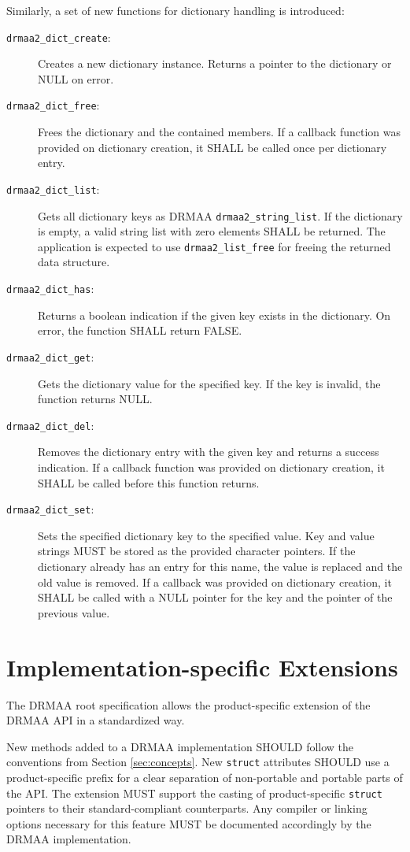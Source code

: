 \documentclass{article}
\newcommand{\h}[1]{\texttt{#1}}
\begin{document}
Similarly, a set of new functions for dictionary handling is introduced:

\begin{description}
\item[\h{drmaa2\_dict\_create}:] Creates a new dictionary instance. Returns a pointer to the dictionary or NULL on error.
\item[\h{drmaa2\_dict\_free}:] Frees the dictionary and the contained members. If a callback function was provided on dictionary creation, it SHALL be called once per dictionary entry.
\item[\h{drmaa2\_dict\_list}:] Gets all dictionary keys as DRMAA \h{drmaa2\_string\_list}. If the dictionary is empty, a valid string list with zero elements SHALL be returned. The application is expected to use \h{drmaa2\_list\_free} for freeing the returned data structure.  
\item[\h{drmaa2\_dict\_has}:] Returns a boolean indication if the given key exists in the dictionary. On error, the function SHALL return FALSE. 
\item[\h{drmaa2\_dict\_get}:] Gets the dictionary value for the specified key. If the key is invalid, the function returns NULL. 
\item[\h{drmaa2\_dict\_del}:] Removes the dictionary entry with the given key and returns a success indication. If a callback function was provided on dictionary creation, it SHALL be called before this function returns. 
\item[\h{drmaa2\_dict\_set}:] Sets the specified dictionary key to the specified value. Key and value strings MUST be stored as the provided character pointers. If the dictionary already has an entry for this name, the value is replaced and the old value is removed. If a callback was provided on dictionary creation, it SHALL be called with a NULL pointer for the key and the pointer of the previous value. 
\end{description}

\section{Implementation-specific Extensions}

The DRMAA root specification allows the product-specific extension of the DRMAA API in a standardized way. 

New methods added to a DRMAA implementation SHOULD follow the conventions from Section \ref{sec:concepts}. New \h{struct} attributes SHOULD use a product-specific prefix for a clear separation of non-portable and portable parts of the API. The extension MUST support the casting of product-specific \h{struct} pointers to their standard-compliant counterparts. Any compiler or linking options necessary for this feature MUST be documented accordingly by the DRMAA implementation.
\end{document}
